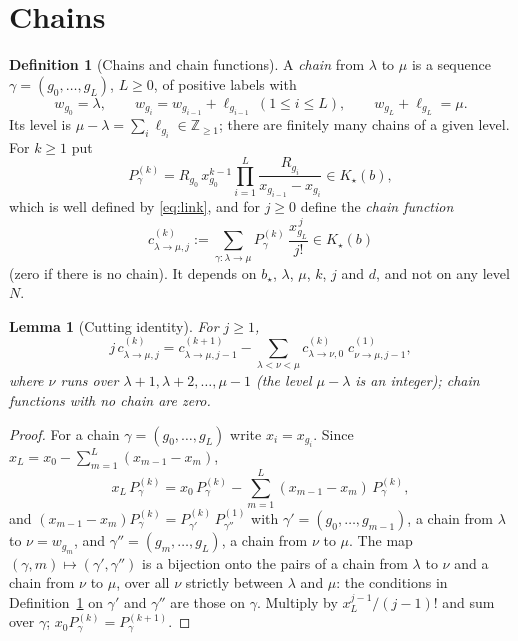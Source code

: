 \documentclass[11pt]{article}
\newtheorem{lemma}[theorem]{Lemma}
\theoremstyle{definition}
\newtheorem{definition}[theorem]{Definition}
\theoremstyle{remark}
\begin{document}
\section{Chains}

\begin{definition}[Chains and chain functions]\label{def:chain}
A \emph{chain} from $\lambda$ to $\mu$ is a sequence $\gamma=(g_0,\dots,g_L)$,
$L\ge0$, of positive labels with
\[
 w_{g_0}=\lambda,\qquad w_{g_i}=w_{g_{i-1}}+\ell_{g_{i-1}}\ (1\le i\le L),\qquad
 w_{g_L}+\ell_{g_L}=\mu .
\]
Its level is $\mu-\lambda=\sum_i\ell_{g_i}\in\mathbb Z_{\ge1}$; there are finitely
many chains of a given level.  For $k\ge1$ put
\[
 P^{(k)}_\gamma=R_{g_0}\,x_{g_0}^{k-1}\prod_{i=1}^{L}
 \frac{R_{g_i}}{x_{g_{i-1}}-x_{g_i}}\in K_\star(b),
\]
which is well defined by \eqref{eq:link}, and for $j\ge0$ define the
\emph{chain function}
\[
 c^{(k)}_{\lambda\to\mu,j}:=\sum_{\gamma:\lambda\to\mu}P^{(k)}_\gamma\,
 \frac{x_{g_L}^{\,j}}{j!}\in K_\star(b)
\]
(zero if there is no chain).  It depends on $b_\star$, $\lambda$, $\mu$, $k$,
$j$ and $d$, and not on any level $N$.
\end{definition}

\begin{lemma}[Cutting identity]\label{lem:cut}
For $j\ge1$,
\[
 j\,c^{(k)}_{\lambda\to\mu,j}
 =c^{(k+1)}_{\lambda\to\mu,j-1}
 -\sum_{\lambda<\nu<\mu}c^{(k)}_{\lambda\to\nu,0}\;c^{(1)}_{\nu\to\mu,j-1},
\]
where $\nu$ runs over $\lambda+1,\lambda+2,\dots,\mu-1$ (the level
$\mu-\lambda$ is an integer); chain functions with no chain are zero.
\end{lemma}

\begin{proof}
For a chain $\gamma=(g_0,\dots,g_L)$ write $x_i=x_{g_i}$.  Since
$x_L=x_0-\sum_{m=1}^{L}(x_{m-1}-x_m)$,
\[
 x_L\,P^{(k)}_\gamma=x_0\,P^{(k)}_\gamma-\sum_{m=1}^{L}(x_{m-1}-x_m)\,P^{(k)}_\gamma ,
\]
and $(x_{m-1}-x_m)P^{(k)}_\gamma=P^{(k)}_{\gamma'}\,P^{(1)}_{\gamma''}$ with
$\gamma'=(g_0,\dots,g_{m-1})$, a chain from $\lambda$ to $\nu=w_{g_m}$, and
$\gamma''=(g_m,\dots,g_L)$, a chain from $\nu$ to $\mu$.  The map
$(\gamma,m)\mapsto(\gamma',\gamma'')$ is a bijection onto the pairs of a chain
from $\lambda$ to $\nu$ and a chain from $\nu$ to $\mu$, over all $\nu$ strictly
between $\lambda$ and $\mu$: the conditions in Definition~\ref{def:chain} on
$\gamma'$ and $\gamma''$ are those on $\gamma$.  Multiply by
$x_L^{j-1}/(j-1)!$ and sum over $\gamma$; $x_0P^{(k)}_\gamma=P^{(k+1)}_\gamma$.
\end{proof}
\end{document}
